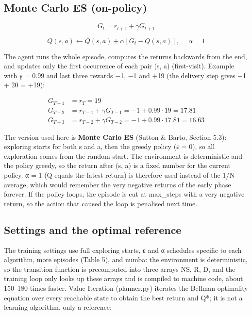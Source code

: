 \documentclass[12pt,a4paper]{article}
\begin{document}
\hypertarget{monte-carlo-es-on-policy}{%
\subsection{Monte Carlo ES
(on-policy)}\label{monte-carlo-es-on-policy}}

\[G_{t} = r_{t + 1} + \gamma G_{t + 1}\]

\[Q(s,a) \leftarrow Q(s,a) + \alpha\left\lbrack G_{t} - Q(s,a) \right\rbrack,\ \ \ \ \ \ \alpha = 1\]

The agent runs the whole episode, computes the returns backwards from
the end, and updates only the first occurrence of each pair (s, a)
(first-visit). Example with γ = 0.99 and last three rewards −1, −1 and
+19 (the delivery step gives −1 + 20 = +19):

\[\begin{aligned}
G_{T - 1} & = r_{T} = 19 \\
G_{T - 2} & = r_{T - 1} + \gamma G_{T - 1} = - 1 + 0.99 \cdot 19 = 17.81 \\
G_{T - 3} & = r_{T - 2} + \gamma G_{T - 2} = - 1 + 0.99 \cdot 17.81 = 16.63
\end{aligned}\]

The version used here is \textbf{Monte Carlo ES} (Sutton \& Barto,
Section 5.3): exploring starts for both s and a, then the greedy policy
(ε = 0), so all exploration comes from the random start. The environment
is deterministic and the policy greedy, so the return after (s, a) is a
fixed number for the current policy. α = 1 (Q equals the latest return)
is therefore used instead of the 1/N average, which would remember the
very negative returns of the early phase forever. If the policy loops,
the episode is cut at max\_steps with a very negative return, so the
action that caused the loop is penalised next time.

\hypertarget{settings-and-the-optimal-reference}{%
\subsection{Settings and the optimal
reference}\label{settings-and-the-optimal-reference}}

The training settings use full exploring starts, ε and α schedules
specific to each algorithm, more episodes (Table 5), and numba: the
environment is deterministic, so the transition function is precomputed
into three arrays NS, R, D, and the training loop only looks up these
arrays and is compiled to machine code, about 150--180 times faster.
Value Iteration (planner.py) iterates the Bellman optimality equation
over every reachable state to obtain the best return and Q*; it is not a
learning algorithm, only a reference:
\end{document}
